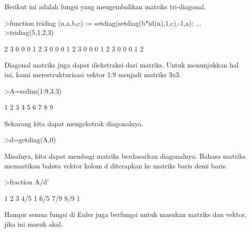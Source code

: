 \documentclass[a4paper,10pt]{article}
\begin{document}
\begin{eulernotebook}
\begin{eulercomment}
\begin{eulercomment}
\begin{eulercomment}
\begin{eulercomment}
\begin{eulercomment}
\begin{eulercomment}
\begin{eulercomment}
Berikut ini adalah fungsi yang mengembalikan matriks tri-diagonal.
\end{eulercomment}
\begin{eulerprompt}
>function tridiag (n,a,b,c) := setdiag(setdiag(b*id(n),1,c),-1,a); ...
>tridiag(5,1,2,3)
\end{eulerprompt}
\begin{euleroutput}
              2             3             0             0             0 
              1             2             3             0             0 
              0             1             2             3             0 
              0             0             1             2             3 
              0             0             0             1             2 
\end{euleroutput}
\begin{eulercomment}
Diagonal matriks juga dapat diekstraksi dari matriks. Untuk
menunjukkan hal ini, kami merestrukturisasi vektor 1:9 menjadi matriks
3x3.
\end{eulercomment}
\begin{eulerprompt}
>A=redim(1:9,3,3)
\end{eulerprompt}
\begin{euleroutput}
              1             2             3 
              4             5             6 
              7             8             9 
\end{euleroutput}
\begin{eulercomment}
Sekarang kita dapat mengekstrak diagonalnya.
\end{eulercomment}
\begin{eulerprompt}
>d=getdiag(A,0)
\end{eulerprompt}
\begin{euleroutput}
  [1,  5,  9]
\end{euleroutput}
\begin{eulercomment}
Misalnya, kita dapat membagi matriks berdasarkan diagonalnya. Bahasa
matriks memastikan bahwa vektor kolom d diterapkan ke matriks baris
demi baris.
\end{eulercomment}
\begin{eulerprompt}
>fraction A/d'
\end{eulerprompt}
\begin{euleroutput}
          1         2         3 
        4/5         1       6/5 
        7/9       8/9         1 
\end{euleroutput}
\begin{eulercomment}
Hampir semua fungsi di Euler juga berfungsi untuk masukan matriks dan
vektor, jika ini masuk akal.


\end{eulercomment}
\end{eulercomment}
\end{eulercomment}
\end{eulercomment}
\end{eulercomment}
\end{eulercomment}
\end{eulercomment}
\end{eulernotebook}
\end{document}
